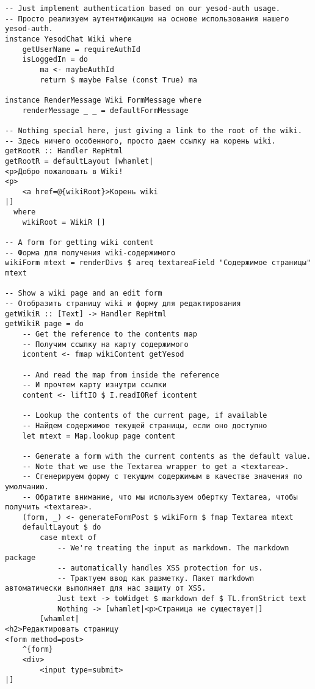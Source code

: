 \begin{lstlisting}
-- Just implement authentication based on our yesod-auth usage.
-- Просто реализуем аутентификацию на основе использования нашего yesod-auth.
instance YesodChat Wiki where
    getUserName = requireAuthId
    isLoggedIn = do
        ma <- maybeAuthId
        return $ maybe False (const True) ma

instance RenderMessage Wiki FormMessage where
    renderMessage _ _ = defaultFormMessage

-- Nothing special here, just giving a link to the root of the wiki.
-- Здесь ничего особенного, просто даем ссылку на корень wiki.
getRootR :: Handler RepHtml
getRootR = defaultLayout [whamlet|
<p>Добро пожаловать в Wiki!
<p>
    <a href=@{wikiRoot}>Корень wiki
|]
  where
    wikiRoot = WikiR []

-- A form for getting wiki content
-- Форма для получения wiki-содержимого
wikiForm mtext = renderDivs $ areq textareaField "Содержимое страницы" mtext

-- Show a wiki page and an edit form
-- Отобразить страницу wiki и форму для редактирования
getWikiR :: [Text] -> Handler RepHtml
getWikiR page = do
    -- Get the reference to the contents map
    -- Получим ссылку на карту содержимого
    icontent <- fmap wikiContent getYesod

    -- And read the map from inside the reference
    -- И прочтем карту изнутри ссылки
    content <- liftIO $ I.readIORef icontent

    -- Lookup the contents of the current page, if available
    -- Найдем содержимое текущей страницы, если оно доступно
    let mtext = Map.lookup page content

    -- Generate a form with the current contents as the default value.
    -- Note that we use the Textarea wrapper to get a <textarea>.
    -- Сгенерируем форму с текущим содержимым в качестве значения по умолчанию.
    -- Обратите внимание, что мы используем обертку Textarea, чтобы получить <textarea>.
    (form, _) <- generateFormPost $ wikiForm $ fmap Textarea mtext
    defaultLayout $ do
        case mtext of
            -- We're treating the input as markdown. The markdown package
            -- automatically handles XSS protection for us.
            -- Трактуем ввод как разметку. Пакет markdown автоматически выполняет для нас защиту от XSS.
            Just text -> toWidget $ markdown def $ TL.fromStrict text
            Nothing -> [whamlet|<p>Страница не существует|]
        [whamlet|
<h2>Редактировать страницу
<form method=post>
    ^{form}
    <div>
        <input type=submit>
|]


\end{lstlisting}
